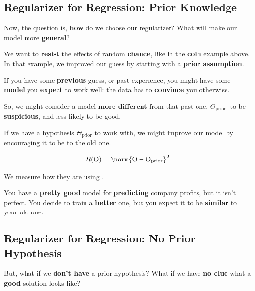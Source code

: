     \subsection*{Regularizer for Regression: Prior Knowledge}
        
        Now, the question is, \textbf{how} do we choose our regularizer? What will make our model more \textbf{general}?
        
        We want to \textbf{resist} the effects of random \textbf{chance}, like in the \textbf{coin} example above. In that example, we improved our guess by starting with a \textbf{prior assumption}.
        
        If you have some \textbf{previous} guess, or past experience, you might have some \textbf{model} you \textbf{expect} to work well: the data has to \textbf{convince} you otherwise.
        
        So, we might consider a model \textbf{more different} from that past one, $\Theta_{\text{prior}}$, to be \textbf{suspicious}, and less likely to be good.\\
        
        \begin{concept}
            If we have a  hypothesis $\Theta_{\text{prior}}$ to work with, we might improve our  model by encouraging it to be  to the old one.
            
            \begin{equation*}
                R(\Theta)= \norm{ \Theta - \Theta_{\text{prior}} }^2
            \end{equation*}
            
            We measure how  they are using .
            
        \end{concept}
        
        \miniex You have a \textbf{pretty good} model for \textbf{predicting} company profits, but it isn't perfect. You decide to train a \textbf{better} one, but you expect it to be \textbf{similar} to your old one.
        
        
    \subsection*{Regularizer for Regression: No Prior Hypothesis}
    
        But, what if we \textbf{don't have} a prior hypothesis? What if we have \textbf{no clue} what a \textbf{good} solution looks like?
        
